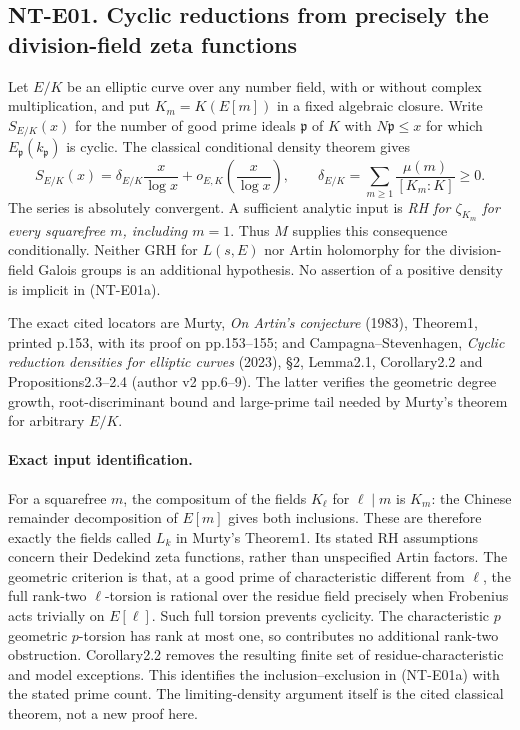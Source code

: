 \subsection*{NT-E01. Cyclic reductions from precisely the division-field zeta functions}
Let $E/K$ be an elliptic curve over any number field, with or without
complex multiplication, and put $K_m=K(E[m])$ in a fixed algebraic closure.
Write $S_{E/K}(x)$ for the number of good prime ideals $\mathfrak p$ of
$K$ with $N\mathfrak p\le x$ for which $E_{\mathfrak p}(k_{\mathfrak p})$
is cyclic. The classical conditional density theorem gives
\[
 S_{E/K}(x)=\delta_{E/K}\frac{x}{\log x}
                 +o_{E,K}\!\left(\frac{x}{\log x}\right),\qquad
 \delta_{E/K}=\sum_{m\ge1}\frac{\mu(m)}{[K_m:K]}\ge0.       \tag{NT-E01a}
\]
The series is absolutely convergent. A sufficient analytic input is
\emph{RH for $\zeta_{K_m}$ for every squarefree $m$, including $m=1$}.
Thus $M$ supplies this consequence conditionally. Neither GRH for
$L(s,E)$ nor Artin holomorphy for the division-field Galois groups is an
additional hypothesis. No assertion of a positive density is implicit
in (NT-E01a).

The exact cited locators are Murty, \emph{On Artin's conjecture}
(1983), Theorem1, printed p.153, with its proof on pp.153--155;
and Campagna--Stevenhagen, \emph{Cyclic reduction densities for
elliptic curves} (2023), \S2, Lemma2.1, Corollary2.2 and
Propositions2.3--2.4 (author v2 pp.6--9). The latter verifies the
geometric degree growth, root-discriminant bound and large-prime
tail needed by Murty's theorem for arbitrary $E/K$.

\paragraph{Exact input identification.}
For a squarefree $m$, the compositum of the fields $K_\ell$ for
$\ell\mid m$ is $K_m$: the Chinese remainder decomposition of
$E[m]$ gives both inclusions. These are therefore exactly the fields
called $L_k$ in Murty's Theorem1. Its stated RH assumptions concern
their Dedekind zeta functions, rather than unspecified Artin factors.
The geometric criterion is that, at a good prime of characteristic
different from $\ell$, the full rank-two $\ell$-torsion is rational
over the residue field precisely when Frobenius acts trivially on
$E[\ell]$. Such full torsion prevents cyclicity. The characteristic
$p$ geometric $p$-torsion has rank at most one, so contributes no
additional rank-two obstruction. Corollary2.2 removes the resulting
finite set of residue-characteristic and model exceptions. This
identifies the inclusion--exclusion in (NT-E01a) with the stated
prime count. The limiting-density argument itself is the cited
classical theorem, not a new proof here.

